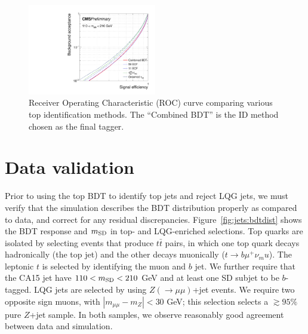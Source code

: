 \begin{figure}[]
    \begin{center}
        \includegraphics[width=0.5\textwidth]{figures/toptagging/bdt/massCut_roc.pdf}
        \caption{Receiver Operating Characteristic (ROC) curve comparing various top identification methods. The ``Combined BDT'' is the ID method chosen as the final tagger.}
        \label{figs:jets:roc}
    \end{center}
\end{figure}

\section{Data validation}
\label{sec:jets:sf}

Prior to using the top BDT to identify top jets and reject LQG jets, we must verify that the simulation describes the BDT distribution properly as compared to data, and correct for any residual discrepancies.
Figure~\ref{fig:jets:bdtdist} shows the BDT response and $m_{\mathrm{SD}}$ in top- and LQG-enriched selections.
Top quarks are isolated by selecting events that produce $t\bar{t}$ pairs, in which one top quark decays hadronically (the top jet) and the other decays muonically ($t\rightarrow b\mu^+\nu_mu$).
The leptonic $t$ is selected by identifying the muon and $b$ jet. 
We further require that the CA15 jet have $110<m_{\mathrm{SD}}<210$ GeV and at least one SD subjet to be $b$-tagged.
LQG jets are selected by using $Z(\rightarrow\mu\mu)$+jet events.
We require two opposite sign muons, with $|m_{\mu\mu}-m_Z|<30$ GeV; this selection selects a $\gtrsim95\%$ pure $Z$+jet sample. 
In both samples, we observe reasonably good agreement between data and simulation.

